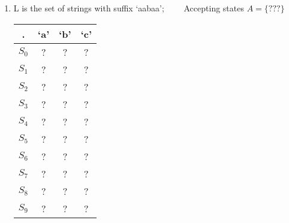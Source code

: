 \documentclass[10pt]{article}
\begin{document}
\begin{enumerate}
\begin{enumerate}
\newpage
\item L is the set of strings with suffix `aabaa'; ~~~~Accepting states $A = \{???\}$
     \begin{center}
      \begin{tabular}{ |c|c|c|c| } 
        \hline
 .  & `a' & `b' & `c' \\\hline \hline
 $S_0$ & ? & ? & ?\\ \hline
 $S_1$ & ? & ? & ? \\ \hline
 $S_2$ & ? & ? & ? \\ \hline
 $S_3$ & ? & ? & ? \\ \hline
 $S_4$ & ? & ? & ? \\ \hline
 $S_5$ & ? & ? & ? \\ \hline
 $S_6$ & ? & ? & ? \\ \hline
 $S_7$ & ? & ? & ? \\ \hline
 $S_8$ & ? & ? & ? \\ \hline
 $S_9$ & ? & ? & ? \\ \hline
\end{tabular}
\end{center}
\end{enumerate}
\end{enumerate}
\end{document}
